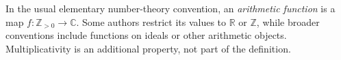 
In the usual elementary number-theory convention, an \emph{arithmetic function} is a map $f:\mathbb Z_{>0}\to\mathbb C$. Some authors restrict its values to $\mathbb R$ or $\mathbb Z$, while broader conventions include functions on ideals or other arithmetic objects. Multiplicativity is an additional property, not part of the definition.
